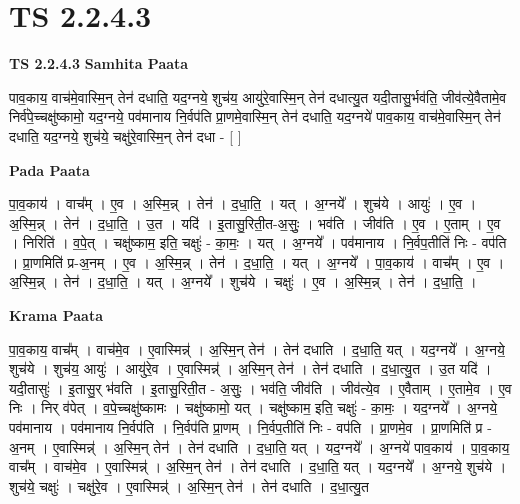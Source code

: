 \documentclass[17pt]{extarticle}
\begin{document}
\section{ TS 2.2.4.3 }

\textbf{TS 2.2.4.3 } \newline
\textbf{Samhita Paata} \newline

पाव॒काय॒ वाच॑मे॒वास्मि॒न् तेन॑ दधाति॒ यद॒ग्नये॒ शुच॑य॒ आयु॑रे॒वास्मि॒न् तेन॑ दधात्यु॒त यदी॒तासु॒र्भव॑ति॒ जीव॑त्ये॒वैतामे॒व निर्व॑पे॒च्चक्षु॑ष्कामो॒ यद॒ग्नये॒ पव॑मानाय नि॒र्वप॑ति प्रा॒णमे॒वास्मि॒न् तेन॑ दधाति॒ यद॒ग्नये॑ पाव॒काय॒ वाच॑मे॒वास्मि॒न् तेन॑ दधाति॒ यद॒ग्नये॒ शुच॑ये॒ चक्षु॑रे॒वास्मि॒न् तेन॑ दधा - [  ] \newline

\textbf{Pada Paata} \newline

पा॒व॒काय॑ । वाच᳚म् । ए॒व । अ॒स्मि॒न्न् । तेन॑ । द॒धा॒ति॒ । यत् । अ॒ग्नये᳚ । शुच॑ये । आयुः॑ । ए॒व । अ॒स्मि॒न्न् । तेन॑ । द॒धा॒ति॒ । उ॒त । यदि॑ । इ॒तासु॒रिती॒त-अ॒सुः॒ । भव॑ति । जीव॑ति । ए॒व । ए॒ताम् । ए॒व । निरिति॑ । व॒पे॒त् । चक्षु॑ष्काम॒ इति॒ चक्षुः॑ - का॒मः॒ । यत् । अ॒ग्नये᳚ । पव॑मानाय । नि॒र्वप॒तीति॑ निः - वप॑ति । प्रा॒णमिति॑ प्र-अ॒नम् । ए॒व । अ॒स्मि॒न्न् । तेन॑ । द॒धा॒ति॒ । यत् । अ॒ग्नये᳚ । पा॒व॒काय॑ । वाच᳚म् । ए॒व । अ॒स्मि॒न्न् । तेन॑ । द॒धा॒ति॒ । यत् । अ॒ग्नये᳚ । शुच॑ये । चक्षुः॑ । ए॒व । अ॒स्मि॒न्न् । तेन॑ । द॒धा॒ति॒ ।  \newline


\textbf{Krama Paata} \newline

पा॒व॒काय॒ वाच᳚म् । वाच॑मे॒व । ए॒वास्मिन्न्॑ । अ॒स्मि॒न् तेन॑ । तेन॑ दधाति । द॒धा॒ति॒ यत् । यद॒ग्नये᳚ । अ॒ग्नये॒ शुच॑ये । शुच॑य॒ आयुः॑ । आयु॑रे॒व । ए॒वास्मिन्न्॑ । अ॒स्मि॒न् तेन॑ । तेन॑ दधाति । द॒धा॒त्यु॒त । उ॒त यदि॑ । यदी॒तासुः॑ । इ॒तासु॒र् भ॑वति । इ॒तासु॒रिती॒त - अ॒सुः॒ । भव॑ति॒ जीव॑ति । जीव॑त्ये॒व । ए॒वैताम् । ए॒तामे॒व । ए॒व निः । निर् व॑पेत् । व॒पे॒च्चक्षु॑ष्कामः । चक्षु॑ष्कामो॒ यत् । चक्षु॑ष्काम॒ इति॒ चक्षुः॑ - का॒मः॒ । यद॒ग्नये᳚ । अ॒ग्नये॒ पव॑मानाय । पव॑मानाय नि॒र्वप॑ति । नि॒र्वप॑ति प्रा॒णम् । नि॒र्वप॒तीति॑ निः - वप॑ति । प्रा॒णमे॒व । प्रा॒णमिति॑ प्र - अ॒नम् । ए॒वास्मिन्न्॑ । अ॒स्मि॒न् तेन॑ । तेन॑ दधाति । द॒धा॒ति॒ यत् । यद॒ग्नये᳚ । अ॒ग्नये॑ पाव॒काय॑ । पा॒व॒काय॒ वाच᳚म् । वाच॑मे॒व । ए॒वास्मिन्न्॑ । अ॒स्मि॒न् तेन॑ । तेन॑ दधाति । द॒धा॒ति॒ यत् । यद॒ग्नये᳚ । अ॒ग्नये॒ शुच॑ये । शुच॑ये॒ चक्षुः॑ । चक्षु॑रे॒व । ए॒वास्मिन्न्॑ । अ॒स्मि॒न् तेन॑ । तेन॑ दधाति । द॒धा॒त्यु॒त \newline
\end{document}
